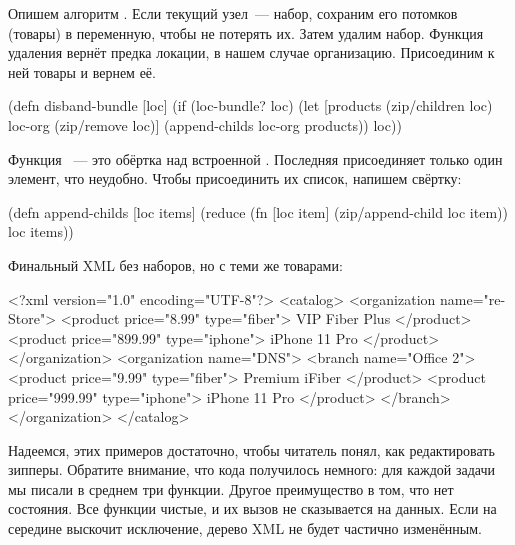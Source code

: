 Опишем алгоритм . Если текущий узел~--- набор, сохраним его
потомков (товары) в переменную, чтобы не потерять их. Затем удалим
набор. Функция удаления вернёт предка локации, в нашем случае
организацию. Присоединим к ней товары и вернем её.

\begin{english}
  \begin{clojure}
(defn disband-bundle [loc]
  (if (loc-bundle? loc)
    (let [products (zip/children loc)
          loc-org (zip/remove loc)]
      (append-childs loc-org products))
    loc))
  \end{clojure}
\end{english}

Функция ~--- это обёртка над встроенной
. Последняя присоединяет только один элемент, что
неудобно. Чтобы присоединить их список, напишем свёртку:

\begin{english}
  \begin{clojure}
(defn append-childs [loc items]
  (reduce (fn [loc item]
            (zip/append-child loc item))
          loc
          items))
  \end{clojure}
\end{english}

Финальный XML без наборов, но с теми же товарами:

\begin{english}
  \begin{xml}
<?xml version="1.0" encoding="UTF-8"?>
<catalog>
  <organization name="re-Store">
    <product price="8.99" type="fiber">
      VIP Fiber Plus
    </product>
    <product price="899.99" type="iphone">
      iPhone 11 Pro
    </product>
  </organization>
  <organization name="DNS">
    <branch name="Office 2">
      <product price="9.99" type="fiber">
        Premium iFiber
      </product>
      <product price="999.99" type="iphone">
        iPhone 11 Pro
      </product>
    </branch>
  </organization>
</catalog>
  \end{xml}
\end{english}

Надеемся, этих примеров достаточно, чтобы читатель понял, как редактировать
зипперы. Обратите внимание, что кода получилось немного: для каждой задачи мы
писали в среднем три функции. Другое преимущество в том, что нет состояния. Все
функции чистые, и их вызов не сказывается на данных. Если на середине выскочит
исключение, дерево XML не будет частично изменённым.

